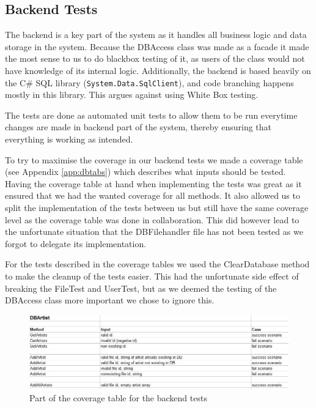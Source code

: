 \subsection{Backend Tests}
The backend is a key part of the system as it handles all business logic and data storage in the system. Because 
the DBAccess class was made as a facade it made the most sense to us to do blackbox testing of it, as users of
the class would not have knowledge of its internal logic. Additionally, the backend is based heavily on the C\#
SQL library (\verb+System.Data.SqlClient+), and code branching happens mostly in this library. This argues against
using White Box testing.

The tests are done as automated unit tests to allow them
to be run everytime changes are made in backend part of the system, thereby ensuring that everything is working as
intended.

To try to maximise the coverage in our backend tests we made a coverage table
(see Appendix \ref{app:dbtabs}) which describes what inputs should be tested.
Having the coverage table at hand when implementing the tests was great as it
ensured that we had the wanted coverage for all methods. It also allowed us to
split the implementation of the tests between us but still have the same
coverage level as the coverage table was done in collaboration. This did 
however lead to the unfortunate situation that the DBFilehandler file has not
been tested as we forgot to delegate its implementation.

For the tests described in the coverage tables we used the ClearDatabase method
to make the cleanup of the tests easier. This had the unfortunate side effect of
breaking the FileTest and UserTest, but as we deemed the testing of the DBAccess
class more important we chose to ignore this. 
\begin{figure}[hbt]
	\centering
	\includegraphics[scale=0.52]{./testing/coverage.jpg}
	\caption{Part of the coverage table for the backend tests}
	\label{fig:covtabs}
\end{figure}
